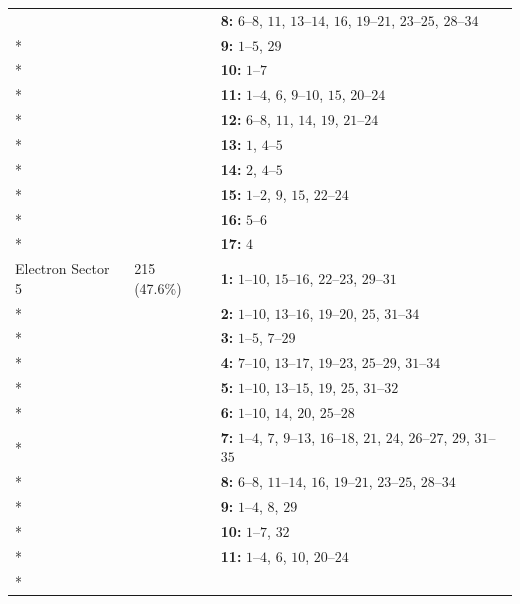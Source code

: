 \begin{longtable}{p{3.5cm}p{2.2cm}p{8.3cm}}
 &  & \textbf{8:} \mbox{$6$--$8$}, \mbox{$11$}, \mbox{$13$--$14$}, \mbox{$16$}, \mbox{$19$--$21$}, \mbox{$23$--$25$}, \mbox{$28$--$34$} \\*
 &  & \textbf{9:} \mbox{$1$--$5$}, \mbox{$29$} \\*
 &  & \textbf{10:} \mbox{$1$--$7$} \\*
 &  & \textbf{11:} \mbox{$1$--$4$}, \mbox{$6$}, \mbox{$9$--$10$}, \mbox{$15$}, \mbox{$20$--$24$} \\*
 &  & \textbf{12:} \mbox{$6$--$8$}, \mbox{$11$}, \mbox{$14$}, \mbox{$19$}, \mbox{$21$--$24$} \\*
 &  & \textbf{13:} \mbox{$1$}, \mbox{$4$--$5$} \\*
 &  & \textbf{14:} \mbox{$2$}, \mbox{$4$--$5$} \\*
 &  & \textbf{15:} \mbox{$1$--$2$}, \mbox{$9$}, \mbox{$15$}, \mbox{$22$--$24$} \\*
 &  & \textbf{16:} \mbox{$5$--$6$} \\*
 &  & \textbf{17:} \mbox{$4$} \\
\addlinespace
Electron Sector 5 & 215 (47.6\%) & \textbf{1:} \mbox{$1$--$10$}, \mbox{$15$--$16$}, \mbox{$22$--$23$}, \mbox{$29$--$31$} \\*
 &  & \textbf{2:} \mbox{$1$--$10$}, \mbox{$13$--$16$}, \mbox{$19$--$20$}, \mbox{$25$}, \mbox{$31$--$34$} \\*
 &  & \textbf{3:} \mbox{$1$--$5$}, \mbox{$7$--$29$} \\*
 &  & \textbf{4:} \mbox{$7$--$10$}, \mbox{$13$--$17$}, \mbox{$19$--$23$}, \mbox{$25$--$29$}, \mbox{$31$--$34$} \\*
 &  & \textbf{5:} \mbox{$1$--$10$}, \mbox{$13$--$15$}, \mbox{$19$}, \mbox{$25$}, \mbox{$31$--$32$} \\*
 &  & \textbf{6:} \mbox{$1$--$10$}, \mbox{$14$}, \mbox{$20$}, \mbox{$25$--$28$} \\*
 &  & \textbf{7:} \mbox{$1$--$4$}, \mbox{$7$}, \mbox{$9$--$13$}, \mbox{$16$--$18$}, \mbox{$21$}, \mbox{$24$}, \mbox{$26$--$27$}, \mbox{$29$}, \mbox{$31$--$35$} \\*
 &  & \textbf{8:} \mbox{$6$--$8$}, \mbox{$11$--$14$}, \mbox{$16$}, \mbox{$19$--$21$}, \mbox{$23$--$25$}, \mbox{$28$--$34$} \\*
 &  & \textbf{9:} \mbox{$1$--$4$}, \mbox{$8$}, \mbox{$29$} \\*
 &  & \textbf{10:} \mbox{$1$--$7$}, \mbox{$32$} \\*
 &  & \textbf{11:} \mbox{$1$--$4$}, \mbox{$6$}, \mbox{$10$}, \mbox{$20$--$24$} \\*

\end{longtable}

